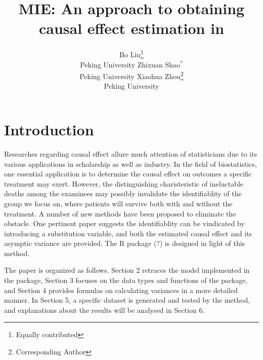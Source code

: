 \documentclass[article]{jss}
\author{Bo Liu\thanks{Equally contributed} \\ Peking University
   \And Zhixuan Shao$^*$ \\ Peking University
   \And Xiaohua Zhou\thanks{Corresponding Author} \\ Peking University}
\title{MIE: An approach to obtaining causal effect estimation in \proglang{R}}
\begin{document}


\section[Introduction: Count data regression in R]{Introduction} \label{sec:intro}


Researches regarding causal effect allure much attention of statisticians due to its various applications in scholarship as well as industry. In the field of biostatistics, one essential application is to determine the causal effect on outcomes a specific treatment may exert. However, the distinguishing charisteristic of ineluctable deaths among the examinees may possibly invalidate the identifiablity of the group we focus on, where patients will survive both with and without the treatment. A number of new methods have been proposed to eliminate the obstacle. One pertinent paper \cite{Wang2017Identification} suggests the identifiablity can be vindicated by introducing a substitution variable, and both the estimated causal effect and its asymptic variance are provided. The R package (?) is designed in light of this method.

The paper is organized as follows. Section 2 retraces the model implemented in the package, Section 3 focuses on the data types and functions of the package, and Section 4 provides formulas on calculating variances in a more detailed manner. In Section 5, a specific dataset is generated and tested by the method, and explanations about the results will be analysed in Section 6.



\end{document}
